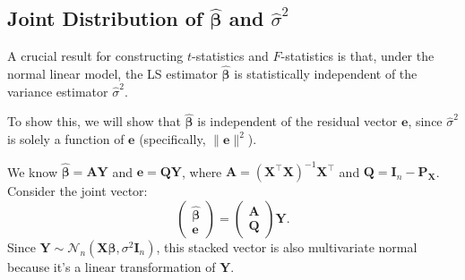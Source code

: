 \documentclass[11pt, letterpaper]{article}
\theoremstyle{plain} %
\theoremstyle{definition} %
\theoremstyle{remark} %
\renewcommand{\mathbf}{\boldsymbol} %
\newcommand{\Normal}{\mathcal{N}}
\newcommand{\I}{\mathbf{I}} %
\begin{document}
\subsection{Joint Distribution of $\hat{\boldsymbol{\beta}}$ and $\hat{\sigma}^2$}

A crucial result for constructing $t$-statistics and $F$-statistics is that, under the normal linear model, the LS estimator $\hat{\boldsymbol{\beta}}$ is statistically independent of the variance estimator $\hat{\sigma}^2$.

To show this, we will show that $\hat{\boldsymbol{\beta}}$ is independent of the residual vector $\boldsymbol{e}$, since $\hat{\sigma}^2$ is solely a function of $\boldsymbol{e}$ (specifically, $\|\boldsymbol{e}\|^2$).

We know $\hat{\boldsymbol{\beta}} = \boldsymbol{A}\boldsymbol{Y}$ and $\boldsymbol{e} = \boldsymbol{Q}\boldsymbol{Y}$, where $\boldsymbol{A} = (\boldsymbol{X}^{\top}\boldsymbol{X})^{-1}\boldsymbol{X}^{\top}$ and $\boldsymbol{Q} = \I_n - \boldsymbol{P_X}$. Consider the joint vector:
\[
\begin{pmatrix} \hat{\boldsymbol{\beta}} \\ \boldsymbol{e} \end{pmatrix}
= \begin{pmatrix} \boldsymbol{A} \\ \boldsymbol{Q} \end{pmatrix} \boldsymbol{Y}.
\]
Since $\boldsymbol{Y} \sim \Normal_n(\boldsymbol{X}\boldsymbol{\beta}, \sigma^2\I_n)$, this stacked vector is also multivariate normal because it's a linear transformation of $\boldsymbol{Y}$.
\end{document}
